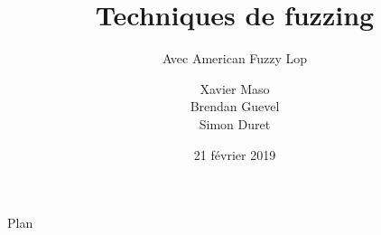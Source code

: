 \documentclass{bredelebeamer}
\title[]{Techniques de fuzzing}
\subtitle{Avec American Fuzzy Lop}
\author[Xavier M. - Brendan G. - Simon D.]{Xavier Maso \\ Brendan Guevel \\ Simon Duret}
\institute[]{
  \texttt{[image: ../medias/universite-bordeaux.pdf]}
}
\date{21 février 2019}
\begin{document}
\begin{frame}
  \titlepage
\end{frame}



\begin{frame}{Plan}
  \tableofcontents
\end{frame}






\end{document}
